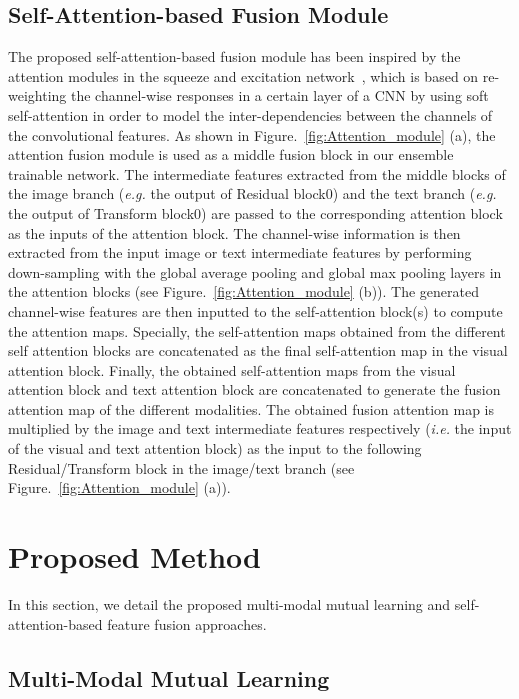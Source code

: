 \documentclass[twocolumn]{svjour3}
\begin{document}
\subsection{Self-Attention-based Fusion Module}
The proposed self-attention-based fusion module has been inspired by the attention modules in the squeeze and excitation network~\cite{Hu_2018_CVPR}, which is based on re-weighting the channel-wise responses in a certain layer of a CNN by using soft self-attention in order to model the inter-dependencies between the channels of the convolutional features. As shown in Figure.~\ref{fig:Attention_module} (a), the attention fusion module is used as a middle fusion block in our ensemble trainable network. The intermediate features extracted from the middle blocks of the image branch (\textit{e.g.} the output of Residual block0) and the text branch (\textit{e.g.} the output of Transform block0) are passed to the corresponding attention block as the inputs of the attention block. The channel-wise information is then extracted from the input image or text intermediate features by performing down-sampling with the global average pooling and global max pooling layers in the attention blocks (see Figure.~\ref{fig:Attention_module} (b)). The generated channel-wise features are then inputted to the self-attention block(s) to compute the attention maps. Specially, the self-attention maps obtained from the different self attention blocks are concatenated as the final self-attention map in the visual attention block. Finally, the obtained self-attention maps from the visual attention block and text attention block are concatenated to generate the fusion attention map of the different modalities. The obtained fusion attention map is multiplied by the image and text intermediate features respectively (\textit{i.e.} the input of the visual and text attention block) as the input to the following Residual/Transform block in the image/text branch (see Figure.~\ref{fig:Attention_module} (a)).


\section{Proposed Method}
\label{sec:roposed Method}
In this section, we detail the proposed multi-modal mutual learning and self-attention-based feature fusion approaches.

\subsection{Multi-Modal Mutual Learning}
 
\end{document}
